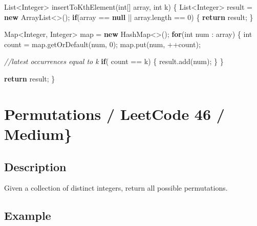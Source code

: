 \documentclass[]{book}
\newenvironment{Shaded}{\begin{snugshade}}{\end{snugshade}}
\newcommand{\BuiltInTok}[1]{#1}
\newcommand{\CommentTok}[1]{\textcolor[rgb]{0.56,0.35,0.01}{\textit{#1}}}
\newcommand{\DataTypeTok}[1]{\textcolor[rgb]{0.13,0.29,0.53}{#1}}
\newcommand{\DecValTok}[1]{\textcolor[rgb]{0.00,0.00,0.81}{#1}}
\newcommand{\FunctionTok}[1]{\textcolor[rgb]{0.00,0.00,0.00}{#1}}
\newcommand{\KeywordTok}[1]{\textcolor[rgb]{0.13,0.29,0.53}{\textbf{#1}}}
\newcommand{\NormalTok}[1]{#1}
\begin{document}
\begin{Shaded}
\begin{Highlighting}[]
\BuiltInTok{List}\NormalTok{<}\BuiltInTok{Integer}\NormalTok{> }\FunctionTok{insertToKthElement}\NormalTok{(}\DataTypeTok{int}\NormalTok{[] array, }\DataTypeTok{int}\NormalTok{ k) \{}
    \BuiltInTok{List}\NormalTok{<}\BuiltInTok{Integer}\NormalTok{> result = }\KeywordTok{new} \BuiltInTok{ArrayList}\NormalTok{<>();}
    \KeywordTok{if}\NormalTok{(array == }\KeywordTok{null}\NormalTok{ || array.}\FunctionTok{length}\NormalTok{ == }\DecValTok{0}\NormalTok{) \{}
        \KeywordTok{return}\NormalTok{ result;}
\NormalTok{    \}}

    \BuiltInTok{Map}\NormalTok{<}\BuiltInTok{Integer}\NormalTok{, }\BuiltInTok{Integer}\NormalTok{> map = }\KeywordTok{new} \BuiltInTok{HashMap}\NormalTok{<>();}
    \KeywordTok{for}\NormalTok{(}\DataTypeTok{int}\NormalTok{ num : array) \{}
        \DataTypeTok{int}\NormalTok{ count = map.}\FunctionTok{getOrDefault}\NormalTok{(num, }\DecValTok{0}\NormalTok{);}
\NormalTok{        map.}\FunctionTok{put}\NormalTok{(num, ++count);}

        \CommentTok{//latest occurrences equal to k}
        \KeywordTok{if}\NormalTok{( count == k) \{}
\NormalTok{            result.}\FunctionTok{add}\NormalTok{(num);}
\NormalTok{        \}}
\NormalTok{    \}}

    \KeywordTok{return}\NormalTok{ result;}
\NormalTok{\}}
\end{Highlighting}
\end{Shaded}

\hypertarget{permutations-leetcode-46-medium}{%
\section{Permutations / LeetCode 46 / Medium\}}\label{permutations-leetcode-46-medium}}

\hypertarget{description-13}{%
\subsection{Description}\label{description-13}}

Given a collection of distinct integers, return all possible permutations.

\hypertarget{example-12}{%
\subsection{Example}\label{example-12}}
\end{document}
